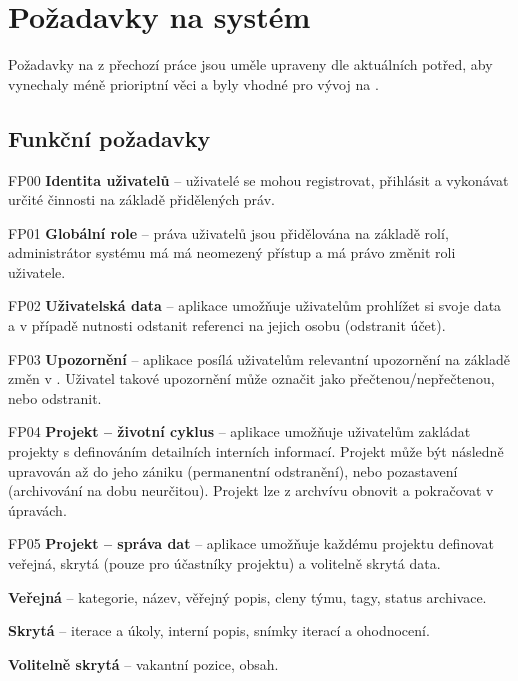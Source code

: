 \section{Požadavky na systém}\label{sec:spec-req}

Požadavky na  z přechozí práce jsou uměle upraveny dle aktuálních potřed, aby vynechaly méně prioriptní věci a byly vhodné pro vývoj na .



\subsection{Funkční požadavky}\label{subsec:spec-req-func}

\begin{dl}
   \item[FP00] \textbf{Identita uživatelů} – uživatelé se mohou registrovat, přihlásit a vykonávat určité činnosti na základě přidělených práv.
   \item[FP01] \textbf{Globální role} – práva uživatelů jsou přidělována na základě rolí, administrátor systému má má neomezený přístup a má právo změnit roli uživatele.
   \item[FP02] \textbf{Uživatelská data} – aplikace umožňuje uživatelům prohlížet si svoje data a v případě nutnosti odstanit referenci na jejich osobu (odstranit účet).
   \item[FP03] \textbf{Upozornění} – aplikace posílá uživatelům relevantní upozornění na základě změn v .
   Uživatel takové upozornění může označit jako přečtenou/nepřečtenou, nebo odstranit.
   \item[FP04] \textbf{Projekt – životní cyklus} – aplikace umožňuje uživatelům zakládat projekty s definováním detailních interních informací.
   Projekt může být následně upravován až do jeho zániku (permanentní odstranění), nebo pozastavení (archivování na dobu neurčitou).
   Projekt lze z archvívu obnovit a pokračovat v úpravách.
   \item[FP05] \textbf{Projekt – správa dat} – aplikace umožňuje každému projektu definovat veřejná, skrytá (pouze pro účastníky projektu) a volitelně skrytá data.
   \begin{ul}
      \item {\textbf{Veřejná} – kategorie, název, věřejný popis, cleny týmu, tagy, status archivace.}
      \item {\textbf{Skrytá} – iterace a úkoly, interní popis, snímky iterací a ohodnocení.}
      \item {\textbf{Volitelně skrytá} – vakantní pozice, obsah.}

\end{ul}
\end{dl}
